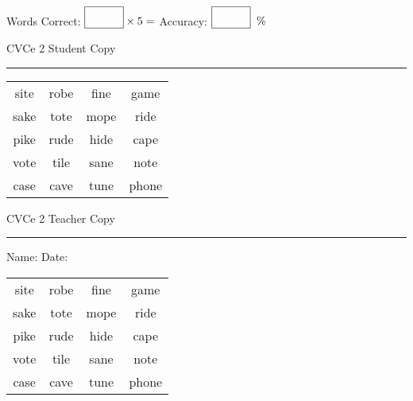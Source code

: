 \documentclass{memoir}
\begin{document}
\small

Words Correct: $\fbox{\phantom{\huge 100}} \times 5 = $ Accuracy: $\fbox{\phantom{\huge 100}}\;\; \%$ 

\vfill

\newpage


\footnotesize \noindent
CVCe 2 \hfill Student Copy
\smallskip
\hrule

\Large

\setlength{\tabcolsep}{14pt}
\def\arraystretch{2}

{\selectfont


\begin{vplace}[0.5]
\begin{center}
\begin{tabular}{cccc}
site & robe & fine & game \\
sake & tote & mope & ride \\
pike & rude & hide & cape \\
vote & tile & sane & note \\
case & cave & tune & phone \\
\end{tabular}
\end{center}
\end{vplace}

}

\newpage

\footnotesize \noindent
CVCe 2 \hfill Teacher Copy
\smallskip
\hrule

\small

\vfill

\noindent
Name: \underline{\hspace{1.75in}} \hfill Date: \underline{\hspace{1in}}

\Large

{\selectfont


\begin{vplace}[0.5]
\begin{center}
\begin{tabular}{cccc}
site & robe & fine & game \\
sake & tote & mope & ride \\
pike & rude & hide & cape \\
vote & tile & sane & note \\
case & cave & tune & phone \\
\end{tabular}
\end{center}
\end{vplace}



}
\end{document}
